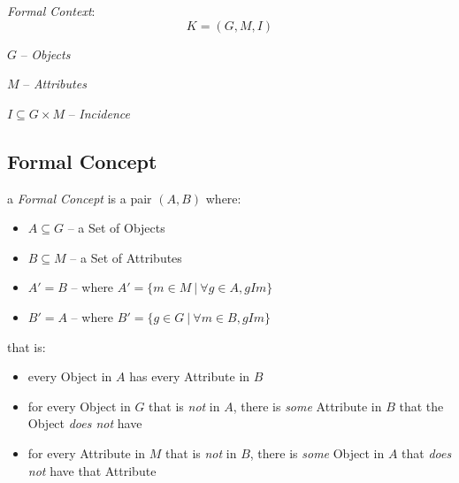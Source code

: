 \emph{Formal Context}:
\[
  K = (G,M,I)
\]

$G$ -- \emph{Objects}

$M$ -- \emph{Attributes}

$I \subseteq G \times M$ -- \emph{Incidence}



\subsection{Formal Concept}\label{sec:formal_concept}

a \emph{Formal Concept} is a pair $(A,B)$ where:
\begin{itemize}
  \item $A \subseteq G$ -- a Set of Objects
  \item $B \subseteq M$ -- a Set of Attributes
  \item $A' = B$ -- where $A' = \{ m \in M \ |\ \forall g \in A, gIm \}$
  \item $B' = A$ -- where $B' = \{ g \in G \ |\ \forall m \in B, gIm \}$
\end{itemize}
that is:
\begin{itemize}
  \item every Object in $A$ has every Attribute in $B$
  \item for every Object in $G$ that is \emph{not} in $A$, there is
    \emph{some} Attribute in $B$ that the Object \emph{does not} have
  \item for every Attribute in $M$ that is \emph{not} in $B$, there is
    \emph{some} Object in $A$ that \emph{does not} have that Attribute
\end{itemize}
